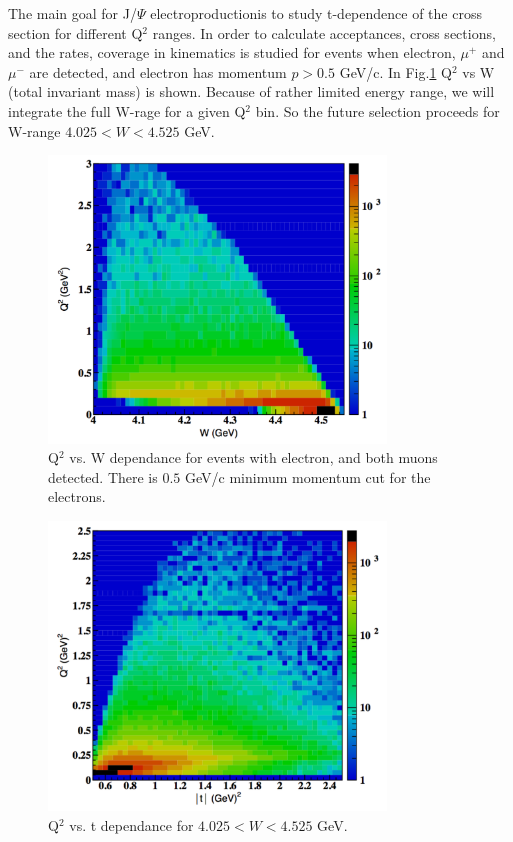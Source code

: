 \indent

The main goal  for J/$\Psi$ electroproductionis to study t-dependence of the cross section for different Q$^2$ ranges. In order to calculate acceptances, cross sections, and the rates, coverage in kinematics is studied for events when electron, $\mu^+$ and $\mu^-$ are detected, and electron has momentum $p>0.5$ GeV/c. In Fig.\ref{fig:jp_e0p5_q2w} Q$^2$ vs W (total invariant mass) is shown. Because of rather limited energy range, we will integrate the full W-rage for a given Q$^2$ bin. So the future selection proceeds for W-range $4.025 < W < 4.525$ GeV.   

\begin{figure}[htbp]
\begin{center} 
\includegraphics[width=0.8\textwidth]{jpsi_q2_w_emin_0p5.pdf}
\caption{Q$^2$ vs. W  dependance for events with electron, and both muons detected. There is $0.5$ GeV/c minimum momentum cut for the electrons.}
\label{fig:jp_e0p5_q2w}
\end{center}
\end{figure}

\begin{figure}[htbp]
\begin{center} 
\includegraphics[width=0.8\textwidth]{jpsi_q2_t_w4025_w4525.pdf}
\caption{Q$^2$ vs. t  dependance for $4.025 < W < 4.525$ GeV.}
\label{fig:jp_q2t}
\end{center}
\end{figure}

